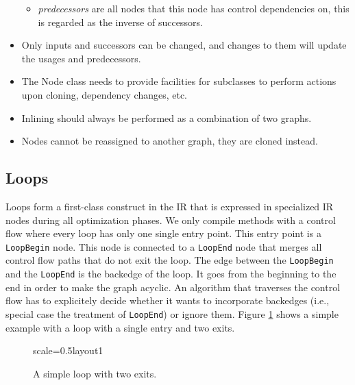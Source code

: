 \documentclass[twocolumn]{svjour3}
\newcommand\nodename[1]{\texttt{#1}}
\begin{document}
\begin{itemize}
\begin{itemize}
        \item \emph{predecessors} are all nodes that this node has control dependencies on, this is regarded as the inverse of successors.
    \end{itemize}
    \item Only inputs and successors can be changed, and changes to them will update the usages and predecessors.
    \item The Node class needs to provide facilities for subclasses to perform actions upon cloning, dependency changes, etc.
    \item Inlining should always be performed as a combination of two graphs.
    \item Nodes cannot be reassigned to another graph, they are cloned instead.
\end{itemize}

\subsection{Loops}
\label{sec:loops}
Loops form a first-class construct in the IR that is expressed in specialized IR nodes during all optimization phases.
We only compile methods with a control flow where every loop has only one single entry point.
This entry point is a \nodename{LoopBegin} node.
This node is connected to a \nodename{LoopEnd} node that merges all control flow paths that do not exit the loop.
The edge between the \nodename{LoopBegin} and the \nodename{LoopEnd} is the backedge of the loop.
It goes from the beginning to the end in order to make the graph acyclic.
An algorithm that traverses the control flow has to explicitely decide whether it wants to incorporate backedges (i.e., special case the treatment of \nodename{LoopEnd}) or ignore them.
Figure \ref{fig:loop1} shows a simple example with a loop with a single entry and two exits.

\begin{figure}[h]
  \label{fig:loop1}
  \centering
\begin{digraphenv}{scale=0.5}{layout1}
\end{digraphenv}
  \caption{A simple loop with two exits.}
\end{figure}
\end{document}
